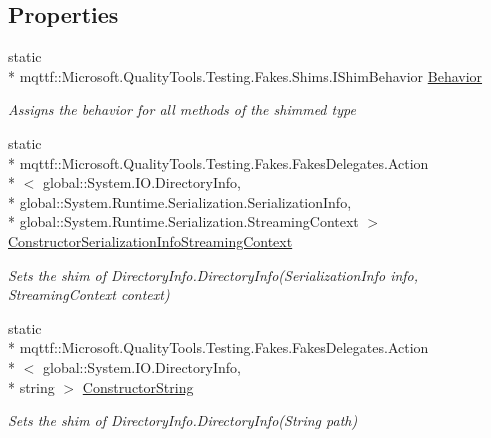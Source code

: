 \subsection*{Properties}
\begin{DoxyCompactItemize}
\item 
static \\*
mqttf\-::\-Microsoft.\-Quality\-Tools.\-Testing.\-Fakes.\-Shims.\-I\-Shim\-Behavior \hyperlink{class_system_1_1_i_o_1_1_fakes_1_1_shim_directory_info_a2ecb0bcdf34017427e8e527b12222372}{Behavior}
\begin{DoxyCompactList}\small\item\em Assigns the behavior for all methods of the shimmed type\end{DoxyCompactList}\item 
static \\*
mqttf\-::\-Microsoft.\-Quality\-Tools.\-Testing.\-Fakes.\-Fakes\-Delegates.\-Action\\*
$<$ global\-::\-System.\-I\-O.\-Directory\-Info, \\*
global\-::\-System.\-Runtime.\-Serialization.\-Serialization\-Info, \\*
global\-::\-System.\-Runtime.\-Serialization.\-Streaming\-Context $>$ \hyperlink{class_system_1_1_i_o_1_1_fakes_1_1_shim_directory_info_aedaeee0c7b142458cc7229bcff2beb56}{Constructor\-Serialization\-Info\-Streaming\-Context}
\begin{DoxyCompactList}\small\item\em Sets the shim of Directory\-Info.\-Directory\-Info(\-Serialization\-Info info, Streaming\-Context context)\end{DoxyCompactList}\item 
static \\*
mqttf\-::\-Microsoft.\-Quality\-Tools.\-Testing.\-Fakes.\-Fakes\-Delegates.\-Action\\*
$<$ global\-::\-System.\-I\-O.\-Directory\-Info, \\*
string $>$ \hyperlink{class_system_1_1_i_o_1_1_fakes_1_1_shim_directory_info_a4ad8fd77683673a8b1dc3b485dc2281e}{Constructor\-String}
\begin{DoxyCompactList}\small\item\em Sets the shim of Directory\-Info.\-Directory\-Info(\-String path)\end{DoxyCompactList}\item 

\end{DoxyCompactItemize}
